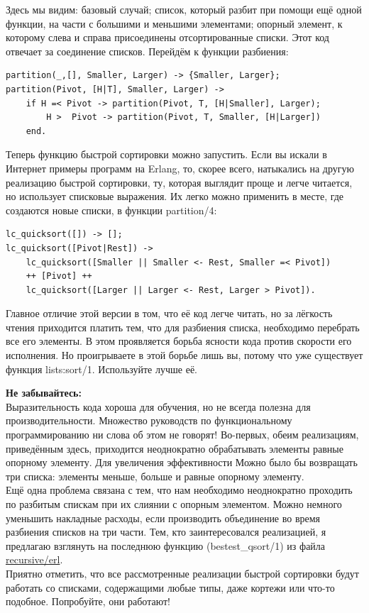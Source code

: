 \documentclass[a4paper,12pt]{report}
\newcommand{\ops}{\colorbox{lgreen}}
\begin{document}
Здесь мы видим: базовый случай; список, который разбит при помощи ещё одной функции, на части с большими и меньшими элементами; опорный элемент, к которому слева и справа присоединены отсортированные списки. Этот код отвечает за соединение списков. Перейдём к функции разбиения:
\begin{lstlisting}[style=erlang]
partition(_,[], Smaller, Larger) -> {Smaller, Larger};
partition(Pivot, [H|T], Smaller, Larger) ->
    if H =< Pivot -> partition(Pivot, T, [H|Smaller], Larger);
        H >  Pivot -> partition(Pivot, T, Smaller, [H|Larger])
    end.
\end{lstlisting}

Теперь функцию быстрой сортировки можно запустить. Если вы искали в Интернет примеры программ на Erlang, то, скорее всего, натыкались на другую реализацию быстрой сортировки, ту, которая выглядит проще и легче читается, но использует списковые выражения. Их легко можно применить в месте, где создаются новые списки, в функции \ops{partition/4}:
\begin{lstlisting}[style=erlang]
lc_quicksort([]) -> [];
lc_quicksort([Pivot|Rest]) ->
    lc_quicksort([Smaller || Smaller <- Rest, Smaller =< Pivot])
    ++ [Pivot] ++
    lc_quicksort([Larger || Larger <- Rest, Larger > Pivot]).
\end{lstlisting}

Главное отличие этой версии в том, что её код легче читать, но за лёгкость чтения приходится платить тем, что для разбиения списка, необходимо перебрать все его элементы. В этом проявляется борьба ясности кода против скорости его исполнения. Но проигрываете в этой борьбе лишь вы, потому что уже существует функция \ops{lists:sort/1}. Используйте лучше её.\\
\colorbox{lorange}
{
    \begin{minipage}{1.0\linewidth}
\textbf{Не забывайтесь:}\\
Выразительность кода хороша для обучения, но не всегда полезна для производительности. Множество руководств по функциональному программированию ни слова об этом не говорят! Во\--первых, обеим реализациям, приведённым здесь, приходится неоднократно обрабатывать элементы равные опорному элементу. Для увеличения эффективности Можно было бы возвращать три списка: элементы меньше, больше и равные опорному элементу.\\
Ещё одна проблема связана с тем, что нам необходимо неоднократно проходить по разбитым спискам при их слиянии с опорным элементом. Можно немного уменьшить накладные расходы, если производить объединение во время разбиения списков на три части. Тем, кто заинтересовался реализацией, я предлагаю взглянуть на последнюю функцию (\ops{bestest\_qsort/1}) из файла \href{http://learnyousomeerlang.com/static/erlang/recursive.erl}{recursive/erl}.\\
Приятно отметить, что все рассмотренные реализации быстрой сортировки будут работать со списками, содержащими любые типы, даже кортежи или что\--то подобное. Попробуйте, они работают!
    \end{minipage}
}
\end{document}
